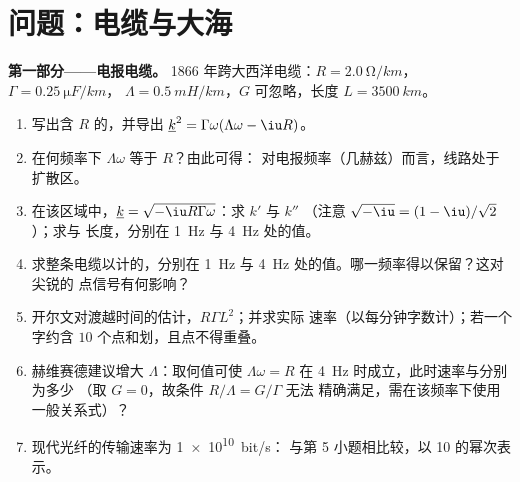 \section{问题：电缆与大海}

\begin{problem}
\label{pb:b2:dispersion-wave-packets:1}

\medskip
\noindent\textbf{第一部分——电报电缆。}
1866 年跨大西洋电缆：$R = \qty{2.0}{\ohm/km}$，$\Gamma = \qty{0.25}{\micro F/km}$，
$\Lambda = \qty{0.5}{mH/km}$，$G$ 可忽略，长度 $L = \qty{3500}{km}$。
\begin{enumerate}
  \item 写出含 $R$ 的，并导出
         $\underline k^2 = \Gamma\omega(\Lambda\omega - \iu R)$。
  \item 在何频率下 $\Lambda\omega$ 等于 $R$？由此可得：
        对电报频率（几赫兹）而言，线路处于
        扩散区。
  \item 在该区域中，$\underline k = \sqrt{-\iu R\Gamma\omega}$：求 $k'$ 与 $k''$
        （注意 $\sqrt{-\iu} = (1 - \iu)/\sqrt2$）；求与
        长度，分别在 \qty{1}{Hz} 与 \qty{4}{Hz} 处的值。
  \item 求整条电缆以计的，分别在 \qty{1}{Hz} 与
        \qty{4}{Hz} 处的值。哪一频率得以保留？这对尖锐的
        点信号有何影响？
  \item 开尔文对渡越时间的估计，$R\Gamma L^2$；并求实际
        速率（以每分钟字数计）；若一个字约含
        $10$ 个点和划，且点不得重叠。
  \item 赫维赛德建议增大 $\Lambda$：取何值可使 $\Lambda\omega = R$
        在 \qty{4}{Hz} 时成立，此时速率与分别为多少
        （取 $G = 0$，故条件 $R/\Lambda = G/\Gamma$ 无法
        精确满足，需在该频率下使用一般关系式）？
  \item 现代光纤的传输速率为 \qty{1e10}{bit/s}：
        与第 5 小题相比较，以 10 的幂次表示。
\end{enumerate}


\end{problem}
